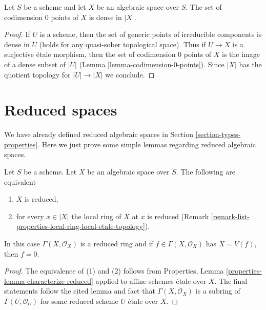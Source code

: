 \begin{lemma}
\label{lemma-codimension-0-points-dense}
Let $S$ be a scheme and let $X$ be an algebraic space over $S$.
The set of codimension $0$ points of $X$ is dense in $|X|$.
\end{lemma}

\begin{proof}
If $U$ is a scheme, then the set of generic points of irreducible
components is dense in $U$ (holds for any quasi-sober topological space).
Thus if $U \to X$ is a surjective \'etale morphism, then the set
of codimension $0$ points of $X$ is the image of a dense subset of
$|U|$ (Lemma \ref{lemma-codimension-0-points}). Since $|X|$ has the
quotient topology for $|U| \to |X|$ we conclude.
\end{proof}





\section{Reduced spaces}
\label{section-reduced}

\noindent
We have already defined reduced algebraic spaces in
Section \ref{section-types-properties}.
Here we just prove some simple lemmas regarding reduced algebraic
spaces.

\begin{lemma}
\label{lemma-reduced-space}
Let $S$ be a scheme. Let $X$ be an algebraic space over $S$.
The following are equivalent
\begin{enumerate}
\item $X$ is reduced,
\item for every $x \in |X|$ the local ring of $X$ at $x$ is
reduced (Remark \ref{remark-list-properties-local-ring-local-etale-topology}).
\end{enumerate}
In this case $\Gamma(X, \mathcal{O}_X)$ is a reduced ring and
if $f \in \Gamma(X, \mathcal{O}_X)$ has $X = V(f)$, then $f = 0$.
\end{lemma}

\begin{proof}
The equivalence of (1) and (2) follows from
Properties, Lemma \ref{properties-lemma-characterize-reduced}
applied to affine schemes \'etale over $X$. The final statements
follow the cited lemma and fact that $\Gamma(X, \mathcal{O}_X)$ is
a subring of $\Gamma(U, \mathcal{O}_U)$ for some
reduced scheme $U$ \'etale over $X$.
\end{proof}

